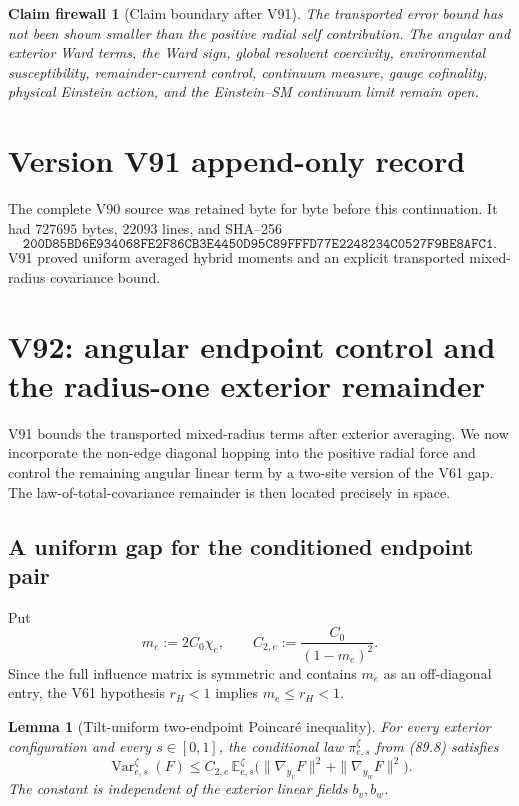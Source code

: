 \documentclass[11pt]{article}
\newtheorem{lemma}[theorem]{Lemma}
\newtheorem{firewall}[theorem]{Claim firewall}
\theoremstyle{remark}
\begin{document}
\begin{firewall}[Claim boundary after V91]
\label{fire:v17v91}
The transported error bound has not been shown smaller than the
positive radial self contribution.  The angular and exterior Ward
terms, the Ward sign, global resolvent coercivity, environmental
susceptibility, remainder-current control, continuum measure, gauge
cofinality, physical Einstein action, and the Einstein--SM continuum
limit remain open.
\end{firewall}

\section*{Version V91 append-only record}
The complete V90 source was retained byte for byte before this
continuation.  It had \(727695\) bytes, \(22093\) lines, and SHA--256
\[
 \texttt{200D85BD6E934068FE2F86CB3E4450D95C89FFFD77E2248234C0527F9BE8AFC1}.
\]
V91 proved uniform averaged hybrid moments and an explicit
transported mixed-radius covariance bound.


\section{V92: angular endpoint control and the radius-one exterior remainder}
\label{sec:v17v92}

V91 bounds the transported mixed-radius terms after exterior
averaging.  We now incorporate the non-edge diagonal hopping into the
positive radial force and control the remaining angular linear term by
a two-site version of the V61 gap.  The law-of-total-covariance
remainder is then located precisely in space.

\subsection{A uniform gap for the conditioned endpoint pair}

Put
\[
 m_e:=2C_0\chi_e,
 \qquad
 C_{2,e}:=\frac{C_0}{(1-m_e)^2}.                    \tag{92.1}
\]
Since the full influence matrix is symmetric and contains \(m_e\) as
an off-diagonal entry, the V61 hypothesis \(r_H<1\) implies
\(m_e\leq r_H<1\).

\begin{lemma}[Tilt-uniform two-endpoint Poincar\'e inequality]
\label{lem:v17v92-two-site-gap}
For every exterior configuration and every \(s\in[0,1]\), the
conditional law \(\pi_{e,s}^{\zeta}\) from (89.8) satisfies
\[
 \operatorname{Var}_{e,s}^{\zeta}(F)
 \leq C_{2,e}\,
 \mathbb E_{e,s}^{\zeta}
 \bigl(\|\nabla_{y_v}F\|^2+\|\nabla_{y_w}F\|^2\bigr).              \tag{92.2}
\]
The constant is independent of the exterior linear fields
\(b_v,b_w\).
\end{lemma}
\end{document}
